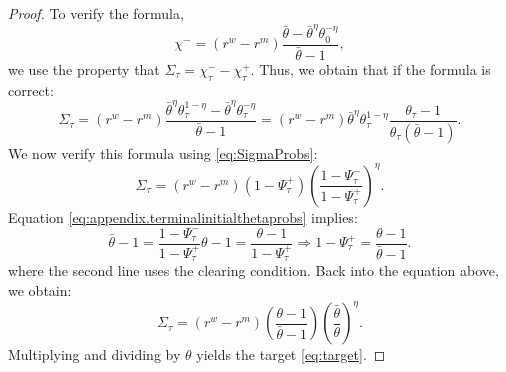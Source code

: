 \begin{proof}
To verify the formula,
\[
\chi^- = (r^w - r^m) \frac{\bar{\theta} - \bar{\theta}^{\eta}\theta_0^{-\eta}}{\bar{\theta} - 1},
\]
we use the property that $\Sigma_\tau=\chi^-_{\tau}-\chi^+_{\tau}.$ Thus, we obtain that if the formula is correct:
\begin{equation}
\label{eq:target}
\Sigma_\tau= (r^w - r^m) \frac{\bar{\theta}^{\eta}\theta_\tau^{1-\eta} - \bar{\theta}^{\eta}\theta_\tau^{-\eta}}{\bar{\theta} - 1}= (r^w - r^m) \bar{\theta}^{\eta}\theta_\tau^{1-\eta}\frac{\theta_\tau-1}{\theta_\tau(\bar{\theta}-1)}.
\end{equation}
We now verify this formula using \eqref{eq:SigmaProbs}:
\[
\Sigma_\tau = (r^w - r^m)(1-\Psi_\tau^+)\left(\frac{1-\Psi_\tau^-}{1-\Psi_\tau^+}\right)^{\eta}.
\]
Equation \eqref{eq:appendix.terminalinitialthetaprobs} implies:
\[
\bar{\theta}-1=\frac{1-\Psi^-_\tau}{1-\Psi^+_\tau}\theta-1=\frac{\theta-1}{1-\Psi^+_\tau}\Rightarrow 1-\Psi^+_\tau=\frac{\theta-1}{\bar{\theta}-1}.
\]
where the second line uses the clearing condition. Back into the equation above, we obtain:
\[
\Sigma_\tau = (r^w - r^m)\left(\frac{\theta-1}{\bar{\theta}-1}\right)\left(\frac{\bar{\theta}}{\theta}\right)^{\eta}.
\]
Multiplying and dividing by $\theta$ yields the target \eqref{eq:target}. 
\end{proof}



